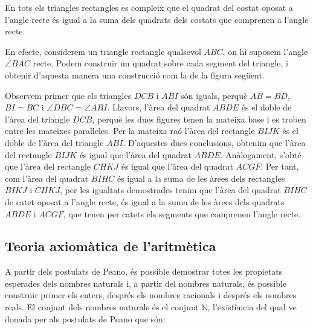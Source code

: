 \begin{thm}
En tots els triangles rectangles es compleix que el quadrat del costat
oposat a l'angle recte \'{e}s igual a la suma dels quadrats dels costats que
comprenen a l'angle recte.
\end{thm}

\begin{prova}
En efecte, considerem un triangle rectangle qualsevol $ABC$, on hi suposem
l'angle $\angle BAC$ recte. Podem construir un quadrat sobre cada segment
del triangle, i obtenir d'aquesta manera una construcci\'{o} com la de la
figura seg\"{u}ent. 

Observem primer que els triangles $DCB$ i $ABI$ s\'{o}n iguals, perqu\`{e} $%
AB=BD$, $BI=BC$ i $\angle DBC=\angle ABI$. Llavors, l'\`{a}rea del quadrat $%
ABDE$ \'{e}s el doble de l'\`{a}rea del triangle $DCB$, perqu\`{e} les dues
figures tenen la mateixa base i es troben entre les mateixes
paral\textperiodcentered leles. Per la mateixa ra\'{o} l'\`{a}rea del
rectangle $BIJK$ \'{e}s el doble de l'\`{a}rea del triangle $ABI$.
D'aquestes dues conclusions, obtenim que l'\`{a}rea del rectangle $BIJK$
\'{e}s igual que l'\`{a}rea del quadrat $ABDE$. An\`{a}logament, s'obt\'{e}
que l'\`{a}rea del rectangle $CHKJ$ \'{e}s igual que l'\`{a}rea del quadrat $%
ACGF$. Per tant, com l'\`{a}rea del quadrat $BIHC$ \'{e}s igual a la suma de
les \`{a}rees dels rectangles $BIKJ$ i $CHKJ$, per les igualtats demostrades
tenim que l'\`{a}rea del quadrat $BIHC$ de catet oposat a l'angle recte,
\'{e}s igual a la suma de les \`{a}rees dels quadrats $ABDE$ i $ACGF$, que
tenen per catets els segments que comprenen l'angle recte.
\end{prova}

\subsection{Teoria axiom\`{a}tica de l'aritm\`{e}tica}

A partir dels postulats de Peano, \'{e}s possible demostrar totes les
propietats esperades dels nombres naturals i, a partir del nombres naturals,
\'{e}s possible construir primer els enters, despr\'{e}s els nombres
racionals i despr\'{e}s els nombres reals. El conjunt dels nombres naturals
\'{e}s el conjunt $\mathbb{N}$, l'exist\`{e}ncia del qual ve donada per als
postulats de Peano que s\'{o}n:

